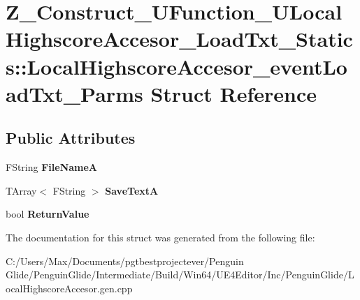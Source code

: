 \hypertarget{struct_z___construct___u_function___u_local_highscore_accesor___load_txt___statics_1_1_local_hig4f769f0fb333d00ad3476ae0b21346ac}{}\section{Z\+\_\+\+Construct\+\_\+\+U\+Function\+\_\+\+U\+Local\+Highscore\+Accesor\+\_\+\+Load\+Txt\+\_\+\+Statics\+::Local\+Highscore\+Accesor\+\_\+event\+Load\+Txt\+\_\+\+Parms Struct Reference}
\label{struct_z___construct___u_function___u_local_highscore_accesor___load_txt___statics_1_1_local_hig4f769f0fb333d00ad3476ae0b21346ac}
\subsection*{Public Attributes}
\begin{DoxyCompactItemize}
\item 
\mbox{\label{struct_z___construct___u_function___u_local_highscore_accesor___load_txt___statics_1_1_local_hig4f769f0fb333d00ad3476ae0b21346ac_a59a8349e03010160ccf4d8817e927fe1}} 
F\+String {\bfseries File\+NameA}
\item 
\mbox{\label{struct_z___construct___u_function___u_local_highscore_accesor___load_txt___statics_1_1_local_hig4f769f0fb333d00ad3476ae0b21346ac_ac06585965e6f5124480f6c3d9a0ad59b}} 
T\+Array$<$ F\+String $>$ {\bfseries Save\+TextA}
\item 
\mbox{\label{struct_z___construct___u_function___u_local_highscore_accesor___load_txt___statics_1_1_local_hig4f769f0fb333d00ad3476ae0b21346ac_a09df98de0a6e2dced5cc985665b71d9a}} 
bool {\bfseries Return\+Value}
\end{DoxyCompactItemize}


The documentation for this struct was generated from the following file\+:\begin{DoxyCompactItemize}
\item 
C\+:/\+Users/\+Max/\+Documents/pgtbestprojectever/\+Penguin Glide/\+Penguin\+Glide/\+Intermediate/\+Build/\+Win64/\+U\+E4\+Editor/\+Inc/\+Penguin\+Glide/Local\+Highscore\+Accesor.\+gen.\+cpp\end{DoxyCompactItemize}
